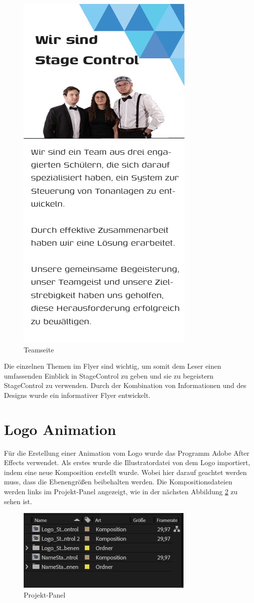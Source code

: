  \begin{figure}[H]
 	\centering
 	\includegraphics[width=0.5\linewidth]{images/Teamseite.png}
 	\caption[Teamseite]{Teamseite}
 	\label{fig:Teamseite}
 \end{figure} 

Die einzelnen Themen im Flyer sind wichtig, um somit dem Leser einen umfassenden Einblick in StageControl zu geben und sie zu begeistern StageControl zu verwenden. Durch der Kombination von Informationen und des Designs wurde ein informativer Flyer entwickelt. 

\section{Logo Animation}
Für die Erstellung einer Animation vom Logo wurde das Programm Adobe After Effects verwendet. Als erstes wurde die Illustratordatei von dem Logo importiert, indem eine neue Komposition erstellt wurde. Wobei hier darauf geachtet werden muss, dass die Ebenengrößen beibehalten werden. Die Kompositionsdateien werden links im Projekt-Panel angezeigt, wie in der nächsten Abbildung \ref{fig:Projekt-Panel} zu sehen ist.

 \begin{figure}[H]
	\centering
	\includegraphics[width=0.5\linewidth]{images/Projekt-Panel.png}
	\caption[Projekt-Panel]{Projekt-Panel}
	\label{fig:Projekt-Panel}
\end{figure} 


